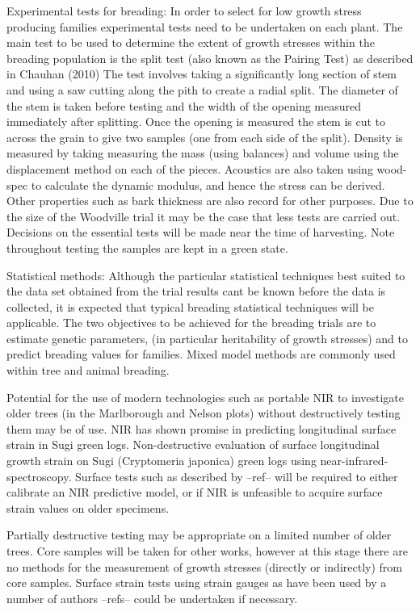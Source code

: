 \documentclass{article}
\begin{document}
Experimental tests for breading:
In order to select for low growth stress producing families experimental tests
need to be undertaken on each plant. The main test to be used to determine the
extent of growth stresses within the breading population is the split test
(also known as the Pairing Test) as described in Chauhan (2010)
The test involves taking a significantly long section of stem and using a saw
cutting along the pith to create a radial split. The diameter of the stem is
taken before testing and the width of the opening measured immediately after
splitting. Once the opening is measured the stem is cut to across the
grain to give two samples (one from each side of the split). Density is
measured by taking measuring the mass (using balances) and volume using the
displacement method on each of the pieces. Acoustics are also taken using
wood-spec to calculate the dynamic modulus, and hence the stress can be derived. Other
properties such as bark thickness are also record for other purposes. Due to
the size of the Woodville trial it may be the case that less tests are carried
out. Decisions on the essential tests will be made near the time of harvesting.
Note throughout testing the samples are kept in a green state.

Statistical methods:
Although the particular statistical techniques best suited to the data set
obtained from the trial results cant be known before the data is collected, it
is expected that typical breading statistical techniques will be
applicable. The two objectives to be achieved for the breading trials are to
estimate genetic parameters, (in particular heritability of growth stresses)
and to predict breading values for families. Mixed model methods are commonly
used within tree and animal breading.

Potential for the use of modern technologies such as portable NIR
to investigate older trees (in the Marlborough and Nelson plots) without
destructively testing them may be of use.
NIR has shown promise in predicting longitudinal surface strain in Sugi green logs.
Non-destructive evaluation of surface longitudinal growth strain
on Sugi (Cryptomeria japonica) green logs using near-infrared-spectroscopy.
Surface tests such as described by --ref-- will be required to either calibrate
an NIR predictive model, or if NIR is unfeasible to acquire surface strain values on
older specimens.

Partially destructive testing may be appropriate on a limited number of older
trees. Core samples will be taken for other works, however at this stage there
are no methods for the measurement of growth stresses (directly or indirectly)
from core samples. Surface strain tests using strain gauges as have been used by
a number of authors --refs-- could be undertaken if necessary.
\end{document}
